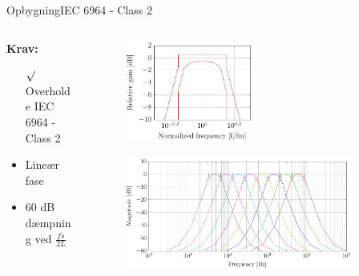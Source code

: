 \begin{frame}{Opbygning}{IEC 6964 - Class 2}

\begin{columns}
  \begin{column}{0.4\textwidth}
\textbf{Krav:}
\begin{itemize}
\item[$\surd$] Overholde IEC 6964 - Class 2 
\item Lineær fase
\item 60 dB dæmpning ved $\frac{fs}{2L}$
\end{itemize}
  \end{column}
  \begin{column}{0.6\textwidth}


\begin{figure}
\centering
\includegraphics[width=0.5\textwidth]{Band1ReqZoom}
\end{figure}
\vspace*{-8mm} 
\begin{figure}
\centering
\includegraphics[width=0.9\textwidth]{allBands}
\end{figure}
  \end{column}
\end{columns}
\end{frame}


